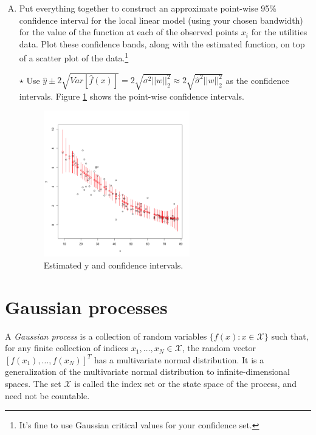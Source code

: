 \documentclass[11pt]{article}
\newcommand{\jie}{$\star$ }
\begin{document}
\begin{enumerate}[(A)]
\item Put everything together to construct an approximate point-wise 95\% confidence interval for the local linear model (using your chosen bandwidth) for the value of the function at each of the observed points $x_i$ for the utilities data.  Plot these confidence bands, along with the estimated function, on top of a scatter plot of the data.\footnote{It's fine to use Gaussian critical values for your confidence set.}

\bigskip \jie
Use $\hat{y} \pm 2\sqrt{Var[\hat{f}(x)]} = 2\sqrt{\sigma^2 ||w||_2^2} \approx 2\sqrt{\hat{\sigma}^2 ||w||_2^2}$ as the confidence intervals. Figure \ref{fig:CI} shows the point-wise confidence intervals.

\begin{figure}[h]
    \centering
    \includegraphics[width=0.6\textwidth]{Ex6/figures/CI.png}
    \caption{Estimated y and confidence intervals.}
    \label{fig:CI}
\end{figure}

\end{enumerate}

\clearpage \newpage
\section{Gaussian processes}

A \textit{Gaussian process} is a collection of random variables $\{f(x): x \in \mathcal{X}\}$ such that, for any finite collection of indices $x_1, \ldots, x_N \in \mathcal{X}$, the random vector $[f(x_1), \ldots, f(x_N)]^T$ has a multivariate normal distribution.  It is a generalization of the multivariate normal distribution to infinite-dimensional spaces. The set $\mathcal{X}$ is called the index set or the state space of the process, and need not be countable.
\end{document}

